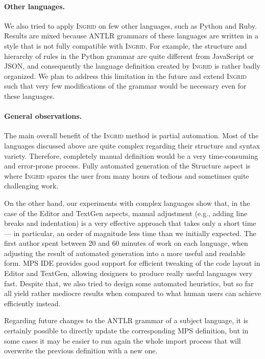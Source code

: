 \paragraph{Other languages.}
We also tried to apply \textsc{Ingrid} on few other languages, such as Python and Ruby.
Results are mixed because ANTLR grammars of these languages are written in a style that is not fully compatible with \textsc{Ingrid}.
For example, the structure and hierarchy of rules in the Python grammar are quite different from JavaScript or JSON, and consequently the language definition created by \textsc{Ingrid} is rather badly organized.
We plan to address this limitation in the future and extend \textsc{Ingrid} such that very few modifications of the grammar would be necessary even for these languages.

\paragraph{General observations.}
The main overall benefit of the \textsc{Ingrid} method is partial automation.
Most of the languages discussed above are quite complex regarding their structure and syntax variety.
Therefore, completely manual definition would be a very time-consuming and error-prone process.
Fully automated generation of the Structure aspect is where \textsc{Ingrid} spares the user from many hours of tedious and sometimes quite challenging work.

On the other hand, our experiments with complex languages show that, in the case of the Editor and TextGen aspects, manual adjustment (e.g., adding line breaks and indentation) is a very effective approach that takes only a short time --- in particular, an order of magnitude less time than we initially expected.
The first author spent between 20 and 60 minutes of work on each language, when adjusting the result of automated generation into a more useful and readable form.
MPS IDE provides good support for efficient tweaking of the code layout in Editor and TextGen, allowing designers to produce really useful languages very fast.
Despite that, we also tried to design some automated heuristics, but so far all yield rather mediocre results when compared to what human users can achieve efficiently instead.

Regarding future changes to the ANTLR grammar of a subject language, it is certainly possible to directly update the corresponding MPS definition, but in some cases it may be easier to run again the whole import process that will overwrite the previous definition with a new one.

